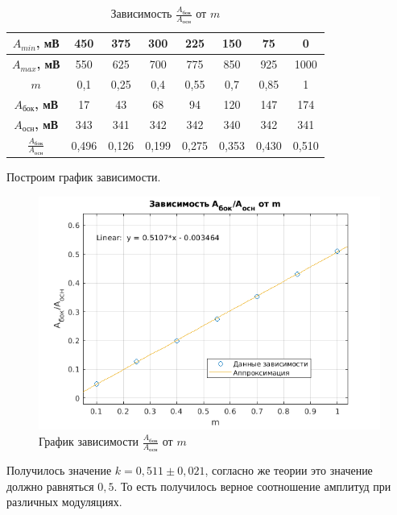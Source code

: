 \documentclass[a4paper, 12pt]{article}%
\begin{document}
\begin{table}[h!]
    \centering
    \begin{tabular}{|c|c|c|c|c|c|c|c|}
        \hline
        \textbf{$A_{min}$, мВ}                           & 450   & 375   & 300   & 225   & 150   & 75    & 0     \\ \hline
        \textbf{$A_{max}$, мВ}                           & 550   & 625   & 700   & 775   & 850   & 925   & 1000  \\ \hline
        \textbf{$m$}                                     & 0,1   & 0,25  & 0,4   & 0,55  & 0,7   & 0,85  & 1     \\ \hline
        \textbf{$A_{\text{бок}}$, мВ}                    & 17    & 43    & 68    & 94    & 120   & 147   & 174   \\ \hline
        \textbf{$A_{\text{осн}}$, мВ}                    & 343   & 341   & 342   & 342   & 340   & 342   & 341   \\ \hline
        \textbf{$\frac{A_{\text{бок}}}{A_{\text{осн}}}$} & 0,496 & 0,126 & 0,199 & 0,275 & 0,353 & 0,430 & 0,510 \\ \hline
    \end{tabular}
    \caption{Зависимость $\frac{A_{\text{бок}}}{A_{\text{осн}}}$ от $m$}
\end{table}

Построим график зависимости.

\begin{figure}[!h]
    \centering
    \includegraphics[width = 13 cm]{images/3_appr.png}
    \caption{График зависимости $\frac{A_{\text{бок}}}{A_{\text{осн}}}$ от $m$}
\end{figure}

Получилось значение $k = 0,511 \pm 0,021$, согласно же теории это значение должно равняться $0,5$. То есть получилось верное соотношение амплитуд при различных модуляциях.
\end{document}
